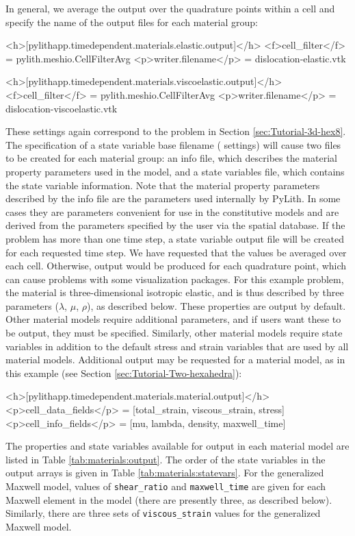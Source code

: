 In general, we average the output over the quadrature points within
a cell and specify the name of the output files for each material
group:
\begin{cfg}
<h>[pylithapp.timedependent.materials.elastic.output]</h>
<f>cell_filter</f> = pylith.meshio.CellFilterAvg
<p>writer.filename</p> = dislocation-elastic.vtk

<h>[pylithapp.timedependent.materials.viscoelastic.output]</h>
<f>cell_filter</f> = pylith.meshio.CellFilterAvg
<p>writer.filename</p> = dislocation-viscoelastic.vtk
\end{cfg}

These settings again correspond to the problem in Section \vref{sec:Tutorial-3d-hex8}.
The specification of a state variable base filename (
settings) will cause two files to be created for each material group:
an info file, which describes the material property parameters used
in the model, and a state variables file, which contains the state
variable information. Note that the material property parameters described
by the info file are the parameters used internally by PyLith. In
some cases they are parameters convenient for use in the constitutive
models and are derived from the parameters specified by the user via
the spatial database. If the problem has more than one time step,
a state variable output file will be created for each requested time
step. We have requested that the values be averaged over each cell.
Otherwise, output would be produced for each quadrature point, which
can cause problems with some visualization packages. For this example
problem, the material is three-dimensional isotropic elastic, and
is thus described by three parameters ($\lambda$, $\mu$, $\rho$),
as described below. These properties are output by default. Other
material models require additional parameters, and if users want these
to be output, they must be specified. Similarly, other material models
require state variables in addition to the default stress and strain
variables that are used by all material models. Additional output
may be requested for a material model, as in this example (see Section
\vref{sec:Tutorial-Two-hexahedra}):
\begin{cfg}
<h>[pylithapp.timedependent.materials.material.output]</h>
<p>cell_data_fields</p> = [total_strain, viscous_strain, stress]
<p>cell_info_fields</p> = [mu, lambda, density, maxwell_time]
\end{cfg}

The properties and state variables available for output in each
material model are listed in Table
\vref{tab:materials:output}. The order of the state variables in
the output arrays is given in Table \vref{tab:materials:statevars}.
For the generalized Maxwell model, values of \texttt{shear\_ratio} and
\texttt{maxwell\_time} are given for each Maxwell element in the model
(there are presently three, as described below). Similarly, there are
three sets of \texttt{viscous\_strain} values for the generalized
Maxwell model.

